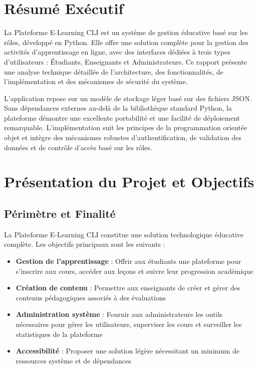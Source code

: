 \documentclass[12pt,a4paper]{article}
\begin{document}
\newpage

\section*{Résumé Exécutif}

La Plateforme E-Learning CLI est un système de gestion éducative basé sur les rôles, développé en Python. Elle offre une solution complète pour la gestion des activités d'apprentissage en ligne, avec des interfaces dédiées à trois types d'utilisateurs : Étudiants, Enseignants et Administrateurs. Ce rapport présente une analyse technique détaillée de l'architecture, des fonctionnalités, de l'implémentation et des mécanismes de sécurité du système.

\vspace{10pt}
L'application repose sur un modèle de stockage léger basé sur des fichiers JSON. Sans dépendances externes au-delà de la bibliothèque standard Python, la plateforme démontre une excellente portabilité et une facilité de déploiement remarquable. L'implémentation suit les principes de la programmation orientée objet et intègre des mécanismes robustes d'authentification, de validation des données et de contrôle d'accès basé sur les rôles.

\newpage

\section{Présentation du Projet et Objectifs}

\subsection{Périmètre et Finalité}

La Plateforme E-Learning CLI constitue une solution technologique éducative complète. Les objectifs principaux sont les suivants :

\begin{itemize}
    \item \textbf{Gestion de l'apprentissage} : Offrir aux étudiants une plateforme pour s'inscrire aux cours, accéder aux leçons et suivre leur progression académique
    \item \textbf{Création de contenu} : Permettre aux enseignants de créer et gérer des contenus pédagogiques associés à des évaluations
    \item \textbf{Administration système} : Fournir aux administrateurs les outils nécessaires pour gérer les utilisateurs, superviser les cours et surveiller les statistiques de la plateforme
    \item \textbf{Accessibilité} : Proposer une solution légère nécessitant un minimum de ressources système et de dépendances
\end{itemize}
\end{document}
